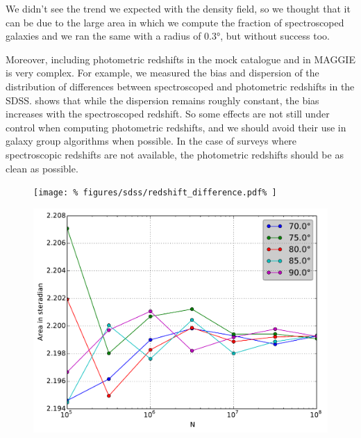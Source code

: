 %
We didn't see the trend we expected with the density field, so we thought that
it can be due to the large area in which we compute the fraction of
spectroscoped galaxies and we ran the same with a radius of 0.3°, but without
success too.

Moreover, including photometric redshifts in the mock catalogue and in MAGGIE
is very complex. For example, we measured the bias and dispersion of the
distribution of differences between spectroscoped and photometric redshifts in
the SDSS\@.  shows that while the dispersion
remains roughly constant, the bias increases with the spectroscoped redshift.
So some effects are not still under control when computing photometric
redshifts, and we should avoid their use in galaxy group algorithms when
possible. In the case of surveys where spectroscopic redshifts are not
available, the photometric redshifts should be as clean as possible.

\begin{figure}[hp]
    \begin{minipage}{\linewidth}
        \centering
        \texttt{[image: \%
            figures/sdss/redshift\_difference.pdf\%
        ]}
    \end{minipage}
    \begin{minipage}{\linewidth}
        \centering
        \includegraphics[height=0.4\textheight]{figures/sdss/SDSS_area}
    \end{minipage}
\end{figure}

